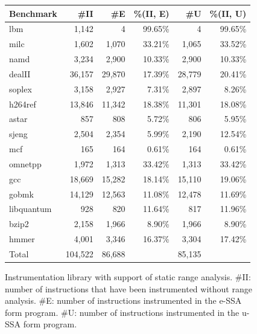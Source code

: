 \documentclass{sigplanconf}[10pt]
\begin{document}
\begin{figure}[t!]
\begin{center}
\begin{small}
\begin{tabular*}{\columnwidth}{@{\extracolsep{\fill}}|l|r|r|r|r|r|}
\hline
Benchmark  &   \#II &  \#E & \%(II, E) &  \#U & \%(II, U) \\ \hline
lbm        &  1,142 &      4 & 99.65\% &      4 & 99.65\% \\ \hline
milc       &  1,602 &  1,070 & 33.21\% &  1,065 & 33.52\% \\ \hline
namd       &  3,234 &  2,900 & 10.33\% &  2,900 & 10.33\% \\ \hline
dealII     & 36,157 & 29,870 & 17.39\% & 28,779 & 20.41\% \\ \hline
soplex     &  3,158 &  2,927 &  7.31\% &  2,897 &  8.26\% \\ \hline
h264ref    & 13,846 & 11,342 & 18.38\% & 11,301 & 18.08\% \\ \hline
astar      &    857 &    808 &  5.72\% &    806 &  5.95\% \\ \hline
sjeng      &  2,504 &  2,354 &  5.99\% &  2,190 & 12.54\% \\ \hline
mcf        &    165 &    164 &  0.61\% &    164 &  0.61\% \\ \hline
omnetpp    &  1,972 &  1,313 & 33.42\% &  1,313 & 33.42\% \\ \hline
gcc        & 18,669 & 15,282 & 18.14\% & 15,110 & 19.06\% \\ \hline
gobmk      & 14,129 & 12,563 & 11.08\% & 12,478 & 11.69\% \\ \hline
libquantum &    928 &    820 & 11.64\% &    817 & 11.96\% \\ \hline
bzip2      &  2,158 &  1,966 &  8.90\% &  1,966 &  8.90\% \\ \hline
hmmer      &  4,001 &  3,346 & 16.37\% &  3,304 & 17.42\% \\ \hline
Total      & 104,522 & 86,688 &        & 85,135 &         \\ \hline
\end{tabular*}
\end{small}
\end{center}
\caption{\label{fig:prunningTable}
Instrumentation library with support of static range analysis.
\#II: number of instructions that have been instrumented without range
analysis.
\#E: number of instructions instrumented in the e-SSA form program.
\#U: number of instructions instrumented in the u-SSA form program.}
\end{figure}
\end{document}
